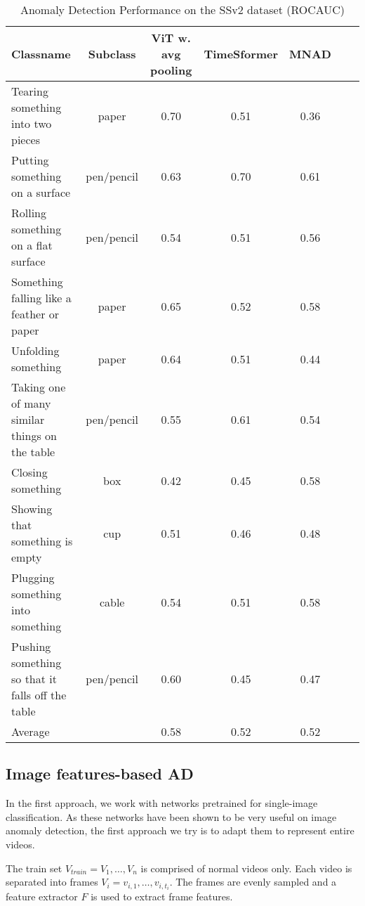 \documentclass{article}
\begin{document}
\begin{table*}[h]
  \centering
  \label{tab:ss2v_eval}

    \begin{tabular}{lcccccc}
    \toprule      

	Classname	& Subclass	&	ViT w. avg pooling	&	TimeSformer	&	MNAD	\\
\midrule										
	Tearing something into two pieces	&	paper	&	0.70	&	0.51	&	0.36	\\
	Putting something on a surface	&	pen/pencil	&	0.63	&	0.70	&	0.61	\\
	Rolling something on a flat surface	&	pen/pencil	&	0.54	&	0.51	&	0.56	\\
	Something falling like a feather or paper	&	paper	&	0.65	&	0.52	&	0.58	\\
	Unfolding something	&	paper	&	0.64	&	0.51	&	0.44	\\
	Taking one of many similar things on the table	&	pen/pencil	&	0.55	&	0.61	&	0.54	\\
	Closing something	&	box	&	0.42	&	0.45	&	0.58	\\
	Showing that something is empty	&	cup	&	0.51	&	0.46	&	0.48	\\
	Plugging something into something	&	cable	&	0.54	&	0.51	&	0.58	\\
	Pushing something so that it falls off the table	&	pen/pencil	&	0.60	&	0.45	&	0.47	\\
\midrule										
	Average	&		&	0.58	&	0.52	&	0.52	\\
	 \bottomrule
    \end{tabular}
    \caption{Anomaly Detection Performance on the SSv2 dataset (ROCAUC)}
\end{table*}

\subsection{Image features-based AD}

In the first approach, we work with networks pretrained for single-image classification. As these networks have been shown to be very useful on image anomaly detection, the first approach we try is to adapt them to represent entire videos.

The train set $V_{train}=V_1,\ldots,V_n$ is comprised of normal videos only. Each video is separated into frames $V_i=v_{i,1},\ldots,v_{i,t_i}$. 
The frames are evenly sampled and a feature extractor $F$ is used to extract frame features.
\end{document}
